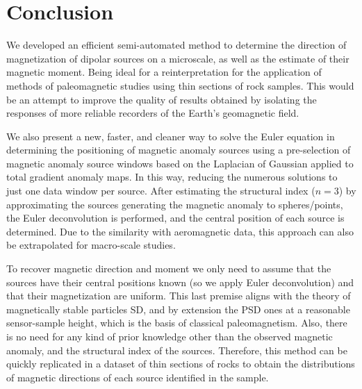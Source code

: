 \section{Conclusion}

We developed an efficient semi-automated method to determine the direction of
magnetization of dipolar sources on a microscale, as well as the estimate of
their magnetic moment. Being ideal for a reinterpretation for the application
of methods of paleomagnetic studies using thin sections of rock samples. This
would be an attempt to improve the quality of results obtained by isolating the
responses of more reliable recorders of the Earth's geomagnetic field.

We also present a new, faster, and cleaner way to solve the Euler equation in
determining the positioning of magnetic anomaly sources using a pre-selection
of magnetic anomaly source windows based on the Laplacian of Gaussian
applied to total gradient anomaly maps. In this way, reducing the numerous
solutions to just one data window per source. After estimating the structural
index ($n = 3$) by approximating the sources generating the magnetic anomaly to
spheres/points, the Euler deconvolution is performed, and the central position
of each source is determined. Due to the similarity with aeromagnetic data, this
approach can also be extrapolated for macro-scale studies.

To recover magnetic direction and moment we only need to assume that the
sources have their central positions known (so we apply Euler deconvolution)
and that their magnetization are uniform. This last premise aligns with the
theory of magnetically stable particles SD, and by extension the PSD ones at a reasonable
sensor-sample height, which is the basis of classical paleomagnetism. Also, there is
no need for any kind of prior knowledge other than the observed magnetic
anomaly, and the structural index of the sources. Therefore, this method can be
quickly replicated in a dataset of thin sections of rocks to obtain the
distributions of magnetic directions of each source identified in the sample.

